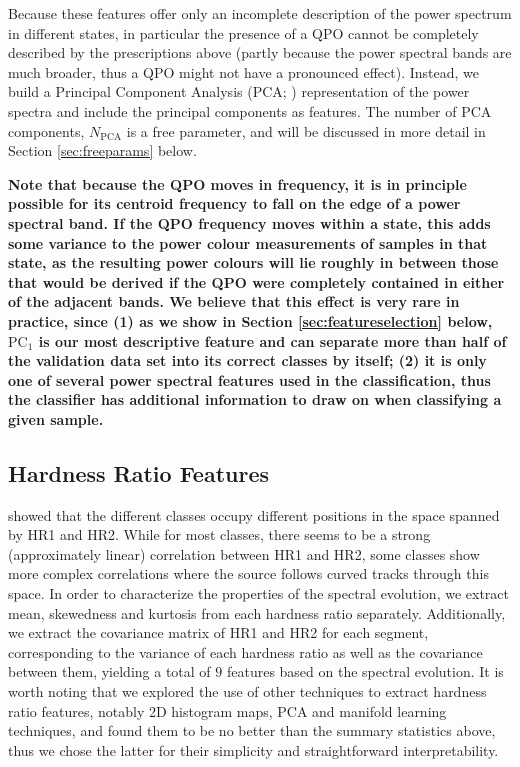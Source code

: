\documentclass[fleqn,usenatbib]{mnras}
\begin{document}
Because these features offer only an incomplete description of the power spectrum in different states, in particular the presence of a QPO cannot be completely described by the prescriptions above (partly because the power spectral bands are much broader, thus a QPO might not have a pronounced effect). Instead, we build a Principal Component Analysis (PCA; \citealt{pearson1901}) representation of the power spectra and include the principal components as features. The number of PCA components, $N_\mathrm{PCA}$ is a free parameter, and will be discussed in more detail in Section \ref{sec:freeparams} below. 

\textbf{Note that because the QPO moves in frequency, it is in principle possible for its centroid frequency to fall on the edge of a power spectral band. If the QPO frequency moves within a state, this adds some variance to the power colour measurements of samples in that state, as the resulting power colours will lie roughly in between those that would be derived if the QPO were completely contained in either of the adjacent bands. We believe that this effect is very rare in practice, since (1) as we show in Section \ref{sec:featureselection} below, $\mathrm{PC}_1$ is our most descriptive feature and can separate more than half of the validation data set into its correct classes by itself; (2) it is only one of several power spectral features used in the classification, thus the classifier has additional information to draw on when classifying a given sample.}

\subsection{Hardness Ratio Features}

\citet{belloni2000} showed that the different classes occupy different positions in the space spanned by HR1 and HR2. While for most classes, there seems to be a strong (approximately linear) correlation between HR1 and HR2, some classes show more complex correlations where the source follows curved tracks through this space. In order to characterize the properties of the spectral evolution, we extract mean, skewedness and kurtosis from each hardness ratio separately. Additionally, we extract the covariance matrix of HR1 and HR2 for each segment, corresponding to the variance of each hardness ratio as well as the covariance between them, yielding a total of $9$ features based on the spectral evolution. It is worth noting that we explored the use of other techniques to extract hardness ratio features, notably 2D histogram maps, PCA and manifold learning techniques, and found them to be no better than the summary statistics above, thus we chose the latter for their simplicity and straightforward interpretability. 
\end{document}

